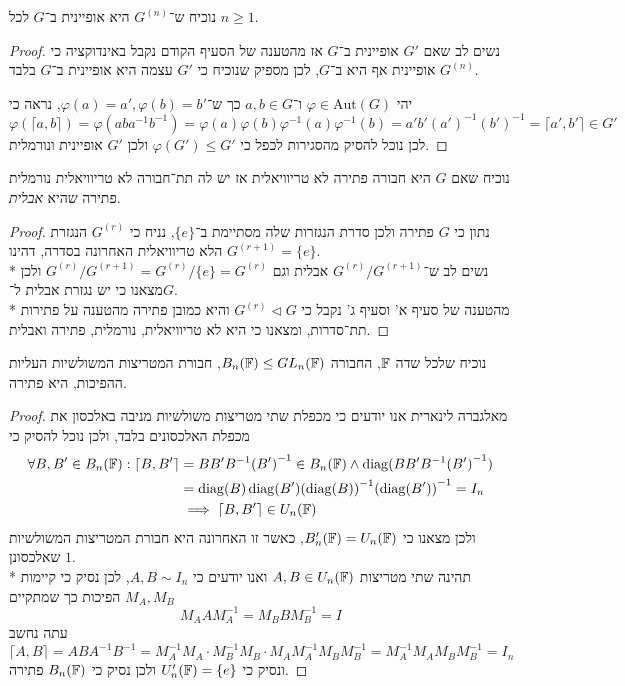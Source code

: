 \Subquestion{}
נוכיח ש־$G^{(n)}$ היא אופיינית ב־$G$ לכל $n \ge 1$.
\begin{proof}
	נשים לב שאם $G'$ אופיינית ב־$G$ אז מהטענה של הסעיף הקודם נקבל באינדוקציה כי $G^{(n)}$ אופיינית אף היא ב־$G$, לכן מספיק שנוכיח כי $G'$ עצמה היא אופיינית ב־$G$ בלבד.

	יהי $\varphi \in \text{Aut}(G)$ ו־$a, b \in G$ כך ש־$\varphi(a) = a', \varphi(b) = b'$, נראה כי
	\[
		\varphi(\lceil a, b \rceil) = \varphi(aba^{-1} b^{-1}) = \varphi(a) \varphi(b) \varphi^{-1}(a) \varphi^{-1}(b) = a' b' {(a')}^{-1} {(b')}^{-1} = \lceil a', b' \rceil \in G'
	\]
	לכן נוכל להסיק מהסגירות לכפל כי $\varphi(G') \le G'$ ולכן $G'$ אופיינית ונורמלית.
\end{proof}

\Subquestion{}
נוכיח שאם $G$ היא חבורה פתירה לא טריוויאלית אז יש לה תת־חבורה לא טריוויאלית נורמלית פתירה שהיא \textit{אבלית}.
\begin{proof}
	נתון כי $G$ פתירה ולכן סדרת הנגזרות שלה מסתיימת ב־$\{ e \}$, נניח כי $G^{(r)}$ הנגזרת הלא טריוויאלית האחרונה בסדרה, דהינו $G^{(r + 1)} = \{ e \}$. \\*
	נשים לב ש־$G^{(r)} / G^{(r + 1)}$ אבלית וגם $G^{(r)} / G^{(r + 1)} = G^{(r)} / \{ e \} = G^{(r)}$ ולכן מצאנו כי יש נגזרת אבלית ל־$G$. \\*
	מהטענה של סעיף א' וסעיף ג' נקבל כי $G^{(r)} \triangleleft G$ והיא כמובן פתירה מהטענה על פתירות תת־סדרות, ומצאנו כי היא לא טריוויאלית, נורמלית, פתירה ואבלית.
\end{proof}

\Question{}
נוכיח שלכל שדה $\mathbb{F}$, החבורה $B_n(\mathbb{F}) \le GL_n(\mathbb{F})$, חבורת המטריצות המשולשיות העליות ההפיכות, היא פתירה.
\begin{proof}
	מאלגברה לינארית אנו יודעים כי מכפלת שתי מטריצות משולשיות מניבה באלכסון את מכפלת האלכסונים בלבד, ולכן נוכל להסיק כי
	\begin{align*}
		\forall B, B' \in B_n(\mathbb{F}) : \lceil B, B' \rceil
		& = B B' B^{-1} {(B')}^{-1} \in B_n(\mathbb{F}) \land \operatorname{diag}(B B' B^{-1} {(B')}^{-1}) \\
		& = \operatorname{diag}(B) \operatorname{diag}(B') {(\operatorname{diag}(B))}^{-1} {(\operatorname{diag}(B'))}^{-1} = I_n \\
		& \implies \lceil B, B' \rceil \in U_n(\mathbb{F})
	\end{align*}
	ולכן מצאנו כי $B_n'(\mathbb{F}) = U_n(\mathbb{F})$, כאשר זו האחרונה היא חבורת המטריצות המשולשיות שאלכסונן $1$. \\*
	תהינה שתי מטריצות $A, B \in U_n(\mathbb{F})$ ואנו יודעים כי $A, B \sim I_n$, לכן נסיק כי קיימות $M_A, M_B$ הפיכות כך שמתקיים
	\[
		M_A A M_A^{-1} = M_B B M_B^{-1} = I
	\]
	עתה נחשב
	\[
		\lceil A, B \rceil = A B A^{-1} B^{-1}
		= M_A^{-1} M_A \cdot M_B^{-1} M_B \cdot M_A M_A^{-1} M_B M_B^{-1}
		= M_A^{-1} M_A M_B M_B^{-1}
		= I_n
	\]
	ונסיק כי $U_n'(\mathbb{F}) = \{ e \}$ ולכן נסיק כי $B_n(\mathbb{F})$ פתירה.
\end{proof}


